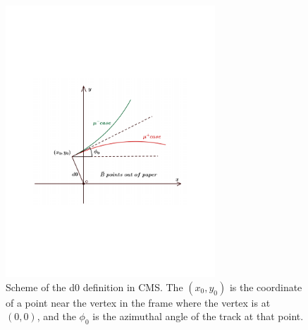 \begin{figure}[!htb]
      \centering
      \captionsetup{justification=justified}
      \includegraphics[width=0.70\textwidth]{pics/muon_corr/GeoFit/d0_def.pdf}
      \caption{Scheme of the d0 definition in CMS. The $(x_{0}, y_{0})$ is the coordinate of 
               a point near the vertex in the frame where the vertex is at $(0,0)$, 
               and the $\phi_{0}$ is the azimuthal angle of the track at that point.}
      \label{fig:d0_def}
\end{figure}

